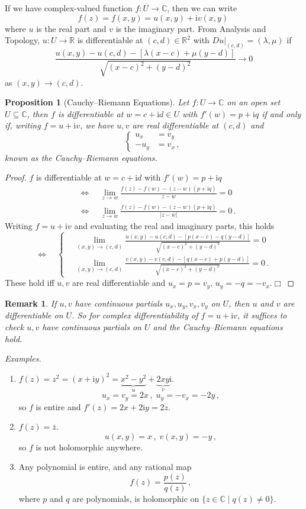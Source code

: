 \documentclass{article}
\theoremstyle{plain}\theoremheaderfont{\normalfont\itshape}\theorembodyfont{\rmfamily}\theoremseparator{.}\newtheorem*{rem}{Remark}\newtheorem*{ex}{Example}\newtheorem*{proof}{Proof}\newtheorem*{altp}{Alternative proof}\newtheorem*{con}{Consequences}\newtheorem*{notn}{Notations}\newtheorem*{cau}{Caution}\newtheorem*{term}{Terminology}\newtheorem*{keyex}{Key example}
\theoremstyle{plain}\theoremheaderfont{\normalfont\bfseries}\theorembodyfont{\rmfamily}\theoremseparator{.}\newtheorem{thm}{Theorem}[section]\newtheorem{lem}[thm]{Lemma}\newtheorem{prop}[thm]{Proposition}\newtheorem*{cor}{Corollary}\newtheorem{defn}[thm]{Definition}\newtheorem{clm}[thm]{Claim}\newtheorem{clminproof}{Claim}\newtheorem{leminproof}{Lemma}\newtheorem{app}{Application}
\theoremstyle{break}\theoremheaderfont{\normalfont\itshape}\theorembodyfont{\rmfamily}\theoremseparator{.\medskip}\newtheorem*{proofskip}{Proof}\newtheorem*{exs}{Examples}\newtheorem*{rems}{Remarks}\newtheorem*{rec}{Recall}\newtheorem*{ppts}{Properties}
\theoremstyle{break}\theoremheaderfont{\normalfont\bfseries}\theorembodyfont{\rmfamily}\theoremseparator{.\medskip}\newtheorem{lemskip}[thm]{Lemma}\newtheorem{defnskip}[thm]{Definition}\newtheorem{propskip}[thm]{Proposition}\newtheorem{thmskip}[thm]{Theorem}
\numberwithin{equation}{section}
\newcommand{\ii}{\mathrm{i}}
\newcommand{\qed}{\hfill\ensuremath{\Box}}
\newcommand{\abs}[1]{\left|#1\right|}
\newcommand{\CC}{\mathbb{C}}
\begin{document}
    If we have complex-valued function \(f:U\to\mathbb{C}\), then we can write
    \[ f(z)=f(x,y)=u(x,y)+\ii v(x,y)\, \]
    where \(u\) is the real part and \(v\) is the imaginary part. From Analysis and Topology, \(u:U\to\mathbb{R}\) is differentiable at \((c,d)\in\mathbb{R}^2\) with \(\left.Du\right|_{(c,d)}=(\lambda,\mu)\) if
    \[ \frac{u(x,y)-u(c,d)-[\lambda(x-c)+\mu(y-d)]}{\sqrt{(x-c)^2+(y-d)^2}}\to 0 \]
    as \((x,y)\to(c,d)\).

    \begin{prop}[Cauchy--Riemann Equations]
        Let \(f:U\to\mathbb{C}\) on an open set \(U\subseteq\CC\), then \(f\) is differentiable at \(w=c+\ii d\in U\) with \(f'(w)=p+\ii q\) if and only if, writing \(f=u+\ii v\), we have \(u,v\) are real differentiable at \((c,d)\) and
        \[\left\{\begin{aligned}
            u_x&=v_y\\
            -u_y&=v_x\,,
        \end{aligned}\right.\]
        known as the \textit{Cauchy--Riemann equations}.
    \end{prop}
    \begin{proof}
		\(f\) is differentiable at \(w=c+\ii d\) with \(f'(w)=p+\ii q\)
		\begin{align*}
			&\iff\quad\lim_{z\to w}\frac{f(z)-f(w)-(z-w)(p+\ii q)}{z-w}=0\\
			&\iff\quad\lim_{z\to w}\frac{f(z)-f(w)-(z-w)(p+\ii q)}{\abs{z-w}}=0\,.
		\end{align*}
		Writing \(f=u+\ii v\) and evaluating the real and imaginary parts, this holds
        \[\iff\quad\left\{\begin{aligned}
            &\lim_{(x,y)\to(c,d)}\frac{u(x,y)-u(c,d)-[p(x-c)-q(y-d)]}{\sqrt{(x-c)^2+(y-d)^2}}=0\\
            &\lim_{(x,y)\to(c,d)}\frac{v(x,y)-v(c,d)-[q(x-c)+p(y-d)]}{\sqrt{(x-c)^2+(y-d)^2}}=0\,.
        \end{aligned}\right.\]
		These hold iff \(u,v\) are real differentiable and \(u_x=p=v_y\), \(u_y=-q=-v_x\).\qed
	\end{proof}
    \begin{rem}
        If \(u,v\) have continuous partials \(u_x,u_y,v_x,v_y\) on \(U\), then \(u\) and \(v\) are differentiable on \(U\). So for complex differentiability of \(f=u+\ii v\), it suffices to check \(u,v\) have continuous partials on \(U\) and the Cauchy--Riemann equations hold.
    \end{rem}
    \textit{Examples.}
    \begin{enumerate}[topsep=0pt,label=(\roman*)]
        \item \(f(z)=z^2=(x+\ii y)^2=\underbrace{x^2-y^2}_{u}+\underbrace{2xy}_{v}\ii\).
        \[u_x=v_y=2x\,,\; u_y=-v_x=-2y\,,\]
        so \(f\) is entire and \(f'(z)=2x+2\ii y=2z\).
        \item \(f(z)=\bar{z}\).
        \[u(x,y)=x\,,\;v(x,y)=-y\,,\]
        so \(f\) is not holomorphic anywhere.
        \item Any polynomial is entire, and any rational map
        \[f(z)=\frac{p(z)}{q(z)}\,,\]
        where \(p\) and \(q\) are polynomials, is holomorphic on \(\{z\in\mathbb{C}\mid q(z)\ne 0\}\).
    \end{enumerate}
\end{document}
